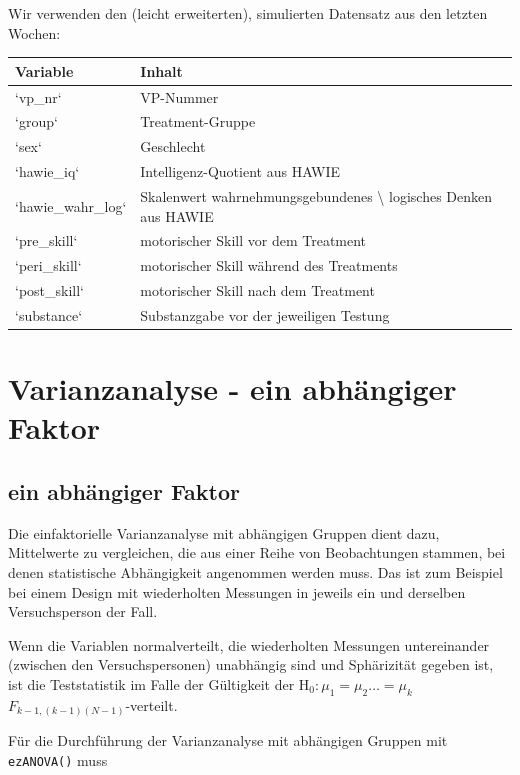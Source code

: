 \documentclass[
]{book}
\begin{document}
Wir verwenden den (leicht erweiterten), simulierten Datensatz aus den letzten Wochen:

\begin{tabular}[t]{ll}
\toprule
Variable & Inhalt\\
\midrule
`vp\_nr` & VP-Nummer\\
`group` & Treatment-Gruppe\\
`sex` & Geschlecht\\
`hawie\_iq` & Intelligenz-Quotient aus HAWIE\\
`hawie\_wahr\_log` & Skalenwert wahrnehmungsgebundenes \textbackslash{} logisches Denken aus HAWIE\\
\addlinespace
`pre\_skill` & motorischer Skill vor dem Treatment\\
`peri\_skill` & motorischer Skill während des Treatments\\
`post\_skill` & motorischer Skill nach dem Treatment\\
`substance` & Substanzgabe vor der jeweiligen Testung\\
\bottomrule
\end{tabular}

\hypertarget{varianzanalyse---ein-abhuxe4ngiger-faktor}{%
\section{Varianzanalyse - ein abhängiger Faktor}\label{varianzanalyse---ein-abhuxe4ngiger-faktor}}

\hypertarget{ein-abhuxe4ngiger-faktor}{%
\subsection{ein abhängiger Faktor}\label{ein-abhuxe4ngiger-faktor}}

Die einfaktorielle Varianzanalyse mit abhängigen Gruppen dient dazu, Mittelwerte zu vergleichen, die aus einer Reihe von Beobachtungen stammen, bei denen statistische Abhängigkeit angenommen werden muss. Das ist zum Beispiel bei einem Design mit wiederholten Messungen in jeweils ein und derselben Versuchsperson der Fall.

Wenn die Variablen normalverteilt, die wiederholten Messungen untereinander (zwischen den Versuchspersonen) unabhängig sind und Sphärizität gegeben ist, ist die Teststatistik im Falle der Gültigkeit der \(\text{H}_0: {\mu}_1 = {\mu}_2 \ldots = {\mu}_k\) \(F_{k-1,(k-1)(N-1)}\)-verteilt.

Für die Durchführung der Varianzanalyse mit abhängigen Gruppen mit \texttt{ezANOVA()} muss
\end{document}
